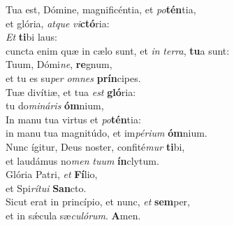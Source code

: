 \evenverse Tua est, Dómine, magnificéntia, et \textit{po}\textbf{tén}tia,~\*\\
\evenverse et glória, \textit{at}\textit{que} \textit{vi}\textbf{ctó}ria:\\
\oddverse \textit{Et} \textbf{ti}bi laus:~\*\\
\oddverse cuncta enim quæ in cælo sunt, et \textit{in} \textit{ter}\textit{ra}, \textbf{tu}a sunt:\\
\evenverse Tuum, Dómi\textit{ne}, \textbf{re}gnum,~\*\\
\evenverse et tu es su\textit{per} \textit{om}\textit{nes} \textbf{prín}cipes.\\
\oddverse Tuæ divítiæ, et tua \textit{est} \textbf{gló}ria:~\*\\
\oddverse tu do\textit{mi}\textit{ná}\textit{ris} \textbf{óm}nium,\\
\evenverse In manu tua virtus et \textit{po}\textbf{tén}tia:~\*\\
\evenverse in manu tua magnitúdo, et im\textit{pé}\textit{ri}\textit{um} \textbf{óm}nium.\\
\oddverse Nunc ígitur, Deus noster, confité\textit{mur} \textbf{ti}bi,~\*\\
\oddverse et laudámus no\textit{men} \textit{tu}\textit{um} \textbf{ín}clytum.\\
\evenverse Glória Patri, \textit{et} \textbf{Fí}lio,~\*\\
\evenverse et Spi\textit{rí}\textit{tu}\textit{i} \textbf{San}cto.\\
\oddverse Sicut erat in princípio, et nunc, \textit{et} \textbf{sem}per,~\*\\
\oddverse et in sǽcula sæ\textit{cu}\textit{ló}\textit{rum}. \textbf{A}men.\\
